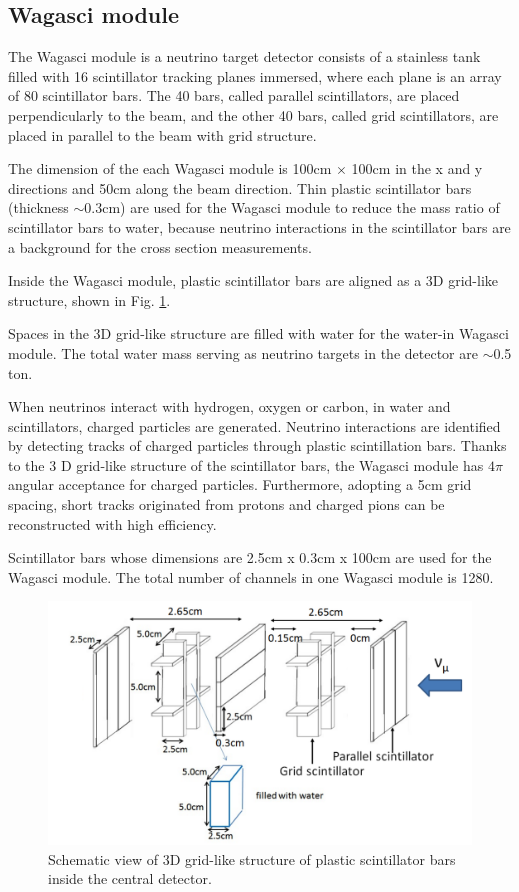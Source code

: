 \subsection{Wagasci module}
The Wagasci module is a neutrino target detector consists of a stainless tank filled with 16 scintillator tracking planes immersed, where each plane is an array of 80 scintillator bars.
The 40 bars, called parallel scintillators, are placed perpendicularly to the beam, and the other 40 bars, called grid scintillators, are placed in parallel to the beam with grid structure.

The dimension of the each Wagasci module is 100cm $\times$ 100cm in the x and y directions
and 50cm along the beam direction.
Thin plastic scintillator bars (thickness $\sim 0.3$cm) are used for the Wagasci module
to reduce  the mass ratio of scintillator bars to water,
because neutrino interactions in the scintillator bars are a background for the cross section measurements.

Inside the Wagasci module, plastic scintillator bars are aligned as a 3D grid-like structure, shown in Fig. \ref{fig:3dgrid}.


Spaces in the 3D grid-like structure are filled with water for the water-in Wagasci module.
The total water mass serving as neutrino targets in the detector are $\sim$0.5 ton.

When neutrinos interact with hydrogen, oxygen or carbon, in water and scintillators,
charged particles are generated.
Neutrino interactions are identified by detecting tracks of charged particles through plastic scintillation bars.
Thanks to the 3 D grid-like structure of the scintillator bars, 
the Wagasci module has $4\pi$ angular acceptance for charged particles.
Furthermore, adopting a 5cm grid spacing, short tracks originated from protons and charged pions can be reconstructed
with high efficiency.

Scintillator bars whose dimensions are 2.5cm x 0.3cm x 100cm are used for the Wagasci module.
The total number of channels in one Wagasci module is 1280.

\begin{figure}[tbh]
\begin{center}
\includegraphics[width=1.0\linewidth]{fig/3d_grid_structure.pdf}
\end{center}
\caption{
Schematic view of 3D grid-like structure of plastic scintillator bars inside the central detector.
}
\label{fig:3dgrid}
\end{figure}

